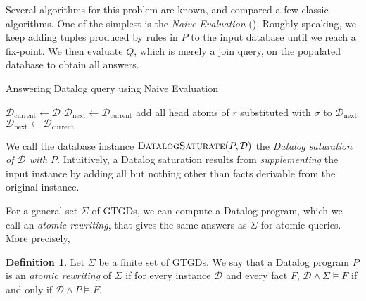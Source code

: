 \documentclass[12pt]{report}
\theoremstyle{plain}
\theoremstyle{definition}
\newtheorem{definition}[theorem]{Definition}
\begin{document}
Several algorithms for this problem are known, and \cite{bancilhon_ramakrishnan_1986} compared a few classic algorithms. One of the simplest is the \emph{Naive Evaluation} (). Roughly speaking, we keep adding tuples produced by rules in $P$ to the input database until we reach a fix-point. We then evaluate $Q$, which is merely a join query, on the populated database to obtain all answers.

\begin{algorithm}
\caption{Answering Datalog query using Naive Evaluation}
\label{naive-evaluation-algorithm}
\begin{algorithmic}[1]
  \State $\mathcal{D}_\mathrm{current} \gets \mathcal{D}$
    \State $\mathcal{D}_\mathrm{next} \gets \mathcal{D}_\mathrm{current}$
        \State add all head atoms of $r$ substituted with $\sigma$ to $\mathcal{D}_\mathrm{next}$
      \EndFor
    \EndFor
    \State
      \State $\mathcal{D}_\mathrm{next} \gets \mathcal{D}_\mathrm{current}$
    \Else
      \State {}
    \EndIf
  \EndWhile
\EndProcedure
\State
{}
  \State {}
\EndProcedure
\end{algorithmic}
\end{algorithm}

We call the database instance $\textsc{DatalogSaturate}(P, \mathcal{D})$ the \emph{Datalog saturation of $\mathcal{D}$ with $P$}. Intuitively, a Datalog saturation results from \emph{supplementing} the input instance by adding all but nothing other than facts derivable from the original instance.

For a general set $\Sigma$ of GTGDs, we can compute a Datalog program, which we call an \emph{atomic rewriting}, that gives the same answers as $\Sigma$ for atomic queries. More precisely,

\begin{definition}
  Let $\Sigma$ be a finite set of GTGDs. We say that a Datalog program $P$ is an \emph{atomic rewriting} of $\Sigma$ if for every instance $\mathcal{D}$ and every fact $F$, $\mathcal{D} \wedge \Sigma \models F$ if and only if $\mathcal{D} \wedge P \models F$.
\end{definition}
\end{document}
